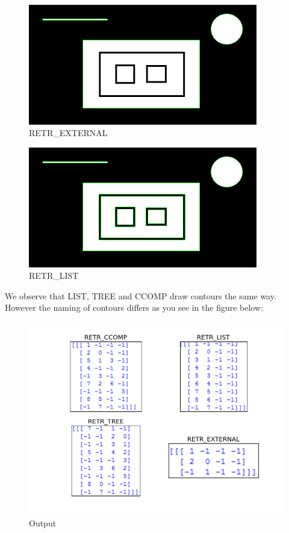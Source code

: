 \documentclass[]{article}
\begin{document}
\begin{figure}[htbp]
\centering
\includegraphics[width = 10cm]{RETR_EXTERNAL.png}
\caption{RETR\_EXTERNAL}
\end{figure}
\begin{figure}[htbp]
	\centering
	\includegraphics[width = 10cm]{RETR_LIST.png}
	\caption{RETR\_LIST}
\end{figure}

\newpage
We observe that LIST, TREE and CCOMP draw contours the same way. However
the naming of contours differs as you see in the figure below:\\
\begin{figure}
\centering
\includegraphics[width = 15cm]{heir2.png} 
\caption{Output}
\end{figure}
\end{document}
